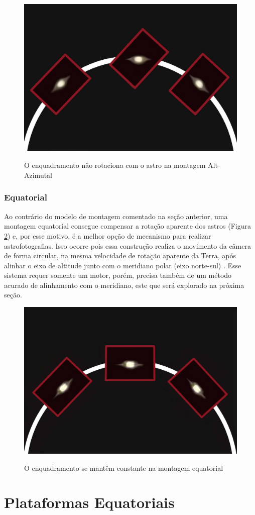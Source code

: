 \begin{figure}[!htb]
	\centering
	\caption{O enquadramento não rotaciona com o astro na montagem Alt-Azimutal}
	\includegraphics[width=0.45\linewidth]{figuras/revisaobiblio/altazimuterotation}
	\label{fig:altazimuterotation}
\end{figure}


\subsubsection{Equatorial}

Ao contrário do modelo de montagem comentado na seção anterior, uma montagem equatorial consegue compensar a rotação aparente dos astros (Figura \ref{fig:equatorialrotation}) e, por esse motivo, é a melhor opção de mecanismo para realizar astrofotografias. Isso ocorre pois essa construção realiza o movimento da câmera de forma circular, na mesma velocidade de rotação aparente da Terra, após alinhar o eixo de altitude junto com o meridiano polar (eixo norte-sul) \cite{book:bbcsky}. Esse sistema requer somente um motor, porém, precisa também de um método acurado de alinhamento com o meridiano, este que será explorado na próxima seção. 

\begin{figure}[!htb]
	\centering
	\caption{O enquadramento se mantêm constante na montagem equatorial}
	\includegraphics[width=0.45\linewidth]{figuras/revisaobiblio/equatorialrotation}
	\label{fig:equatorialrotation}
\end{figure}

\section{Plataformas Equatoriais}


